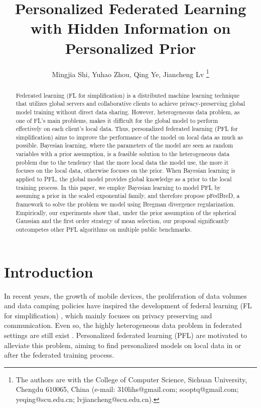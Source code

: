 \documentclass{article}
\title{Personalized Federated Learning with Hidden Information on Personalized Prior}
\author{
    Mingjia Shi, Yuhao Zhou, Qing Ye, Jiancheng Lv 
    \thanks{The authors are with the College of Computer Science, Sichuan University, Chengdu 610065, China (e-mail: 310lihs@gmail.com; sooptq@gmail.com; yeqing@scu.edu.cn; lvjiancheng@scu.edu.cn).}
}
\begin{document}
\maketitle


\begin{abstract}
Federated learning (FL for simplification) is a distributed machine learning technique that utilizes global servers and collaborative clients to achieve privacy-preserving global model training without direct data sharing. However, heterogeneous data problem, as one of FL's main problems, makes it difficult for the global model to perform effectively on each client's local data. Thus, personalized federated learning (PFL for simplification) aims to improve the performance of the model on local data as much as possible. Bayesian learning, where the parameters of the model are seen as random variables with a prior assumption, is a feasible solution to the heterogeneous data problem due to the tendency that the more local data the model use, the more it focuses on the local data, otherwise focuses on the prior. When Bayesian learning is applied to PFL, the global model provides global knowledge as a prior to the local training process. In this paper, we employ Bayesian learning to model PFL by assuming a prior in the scaled exponential family, and therefore propose pFedBreD, a framework to solve the problem we model using Bregman divergence regularization. Empirically, our experiments show that, under the prior assumption of the spherical Gaussian and the first order strategy of mean selection, our proposal significantly outcompetes other PFL algorithms on multiple public benchmarks.
\end{abstract}





\section{Introduction}
\label{sec_intro}

In recent years, the growth of mobile devices, the proliferation of data volumes and data camping policies have inspired the development of federal learning (FL for simplification) \cite{mcmahan2017communication}, which mainly focuses on privacy preserving and communication. Even so, the highly heterogeneous data problem in federated settings are still exist \cite{tan2022towards}. Personalized federated learning (PFL) are motivated to alleviate this problem, aiming to find personalized models on local data in or after the federated training process.
\end{document}
